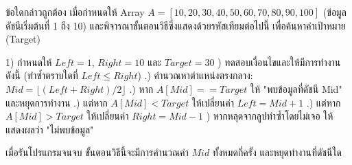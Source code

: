 \question ข้อใดกล่าวถูกต้อง เมื่อกำหนดให้ Array $A = [10, 20, 30, 40, 50, 60, 70, 80, 90, 100]$ (ข้อมูลดัชนีเริ่มต้นที่ 1 ถึง 10) และพิจารณาขั้นตอนวิธีซึ่งแสดงด้วยรหัสเทียมต่อไปนี้ เพื่อค้นหาค่าเป้าหมาย (Target)
\newline
\begin{pseudocode}
1) กำหนดให้ $Left = 1$, $Right = 10$ และ $Target = 30$
) ทดสอบเงื่อนไขและให้มีการทำงานดังนี้ (ทำซ้ำตราบใดที่ $Left \le Right$)
\newline
.) คำนวณหาตำแหน่งตรงกลาง: $Mid = \lfloor (Left + Right) / 2 \rfloor$
\newline
.) หาก $A[Mid] == Target$ ให้ "พบข้อมูลที่ดัชนี Mid" และหยุดการทำงาน
\newline
.) แต่หาก $A[Mid] < Target$ ให้เปลี่ยนค่า $Left = Mid + 1$
\newline
.) แต่หาก $A[Mid] > Target$ ให้เปลี่ยนค่า $Right = Mid - 1$
) หากหลุดจากลูปทำซ้ำโดยไม่เจอ ให้แสดงผลว่า "ไม่พบข้อมูล"
\end{pseudocode}
เมื่อรันโปรแกรมจนจบ ขั้นตอนวิธีนี้จะมีการคำนวณค่า $Mid$ ทั้งหมดกี่ครั้ง และหยุดทำงานที่ดัชนีใด
\newline
{}
